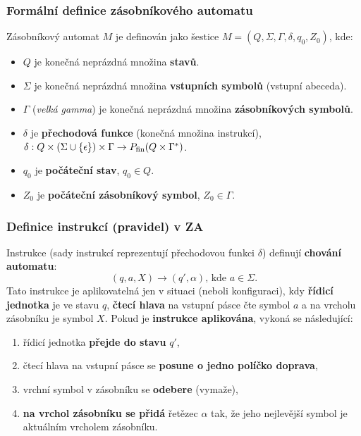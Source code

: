 \subsubsection{Formální definice zásobníkového automatu}
Zásobníkový automat $M$ je definován jako šestice $M = (Q, \Sigma, \Gamma, \delta, q_0, Z_0)$, kde:
\begin{itemize}
\item $Q$ je konečná neprázdná množina \textbf{stavů}.
\item $\Sigma$ je konečná neprázdná množina \textbf{vstupních symbolů} (vstupní abeceda).
\item $\Gamma$ (\textit{velká gamma}) je konečná neprázdná množina \textbf{zásobníkových symbolů}.
\item $\delta$ je \textbf{přechodová funkce} (konečná množina instrukcí), $\delta: Q \times (\Sigma \cup \{\epsilon\}) \times \Gamma \rightarrow P_{\rm fin}(Q \times \Gamma^*)$.
\item $q_0$ je \textbf{počáteční stav}, $q_0 \in Q$.
\item $Z_0$ je \textbf{počáteční zásobníkový symbol}, $Z_0 \in \Gamma$.
\end{itemize}

\subsubsection{Definice instrukcí (pravidel) v ZA}
Instrukce (sady instrukcí reprezentují přechodovou funkci $\delta$) definují \textbf{chování automatu}:
\begin{equation}
(q, a, X) \rightarrow (q', \alpha)\textrm{, kde } a\in \Sigma.
\end{equation}
Tato instrukce je aplikovatelná jen v situaci (neboli konfiguraci), kdy \textbf{řídicí jednotka} je ve stavu $q$, \textbf{čtecí hlava} na vstupní pásce čte symbol $a$ a na vrcholu zásobníku je symbol $X$. Pokud je \textbf{instrukce aplikována}, vykoná se následující:
\begin{enumerate}
\item řídicí jednotka \textbf{přejde do stavu} $q'$,
\item čtecí hlava na vstupní pásce se \textbf{posune o jedno políčko doprava},
\item vrchní symbol v zásobníku se \textbf{odebere} (vymaže),
\item \textbf{na vrchol zásobníku se přidá} řetězec $\alpha$ tak, že jeho nejlevější symbol je aktuálním vrcholem zásobníku.
\end{enumerate}

